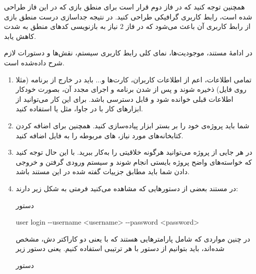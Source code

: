 \documentclass[]{article}
\begin{document}
همچنین توجه کنید که در فاز دوم قرار است برای منطق بازی که در این فاز طراحی شده است، رابط کاربری گرافیکی طراحی کنید. در نتیجه جداسازی درست منطق بازی از رابط کاربری آن باعث می‌شود که در فاز $2$ نیاز به بازنویسی کدهای منطق به شدت کاهش یابد. 

در ادامهٔ مستند، موجودیت‌ها، نمای کلی رابط کاربری سیستم، نقش‌ها و دستورات لازم شرح داده‌شده است.

\begin{enumerate}[label={نکته \arabic*:}]
\item
 تمامی اطلاعات، اعم از اطلاعات کاربران، کارت‌ها و... باید در خارج از برنامه (مثلا روی فایل) ذخیره شوند و پس از  شدن برنامه و اجرای مجدد آن، بصورت خودکار اطلاعات قبلی خوانده شود و قابل دسترسی باشد. برای این کار می‌توانید از ابزارهای کار با  در جاوا، مثل
  \href{https://www.tutorialspoint.com/gson/gson_quick_guide.htm}{\textcolor{blue}{}}
یا
  \href{https://github.com/amogilev/yagson}{\textcolor{blue}{}}
   استفاده‌ کنید.

\item
شما باید پروژه‌ی خود را بر بستر ابزار  پیاده‌سازی کنید. همچنین برای اضافه کردن کتابخانه‌های مورد نیاز،  های مربوطه را به فایل  اضافه کنید.




   

\item
در هر جایی از پروژه می‌توانید هرگونه خلاقیتی را به‌کار ببرید. با این حال توجه کنید که خواسته‌های واضح پروژه بایستی انجام شوند و سیستم ورودی گرفتن و خروجی دادن شما باید مطابق جزییات گفته شده در این مستند باشد.


\item
در مستند بعضی از دستور‌هایی که مشاهده می‌کنید فرمتی به شکل زیر دارند:

\begin{mybox}[colback=yellow]{دستور}
	
	
	\begin{latin}
		
	user login -{}-username <username> -{}-password <password>
		
	\end{latin}
	
\end{mybox}

در چنین مواردی که شامل پارامتر‌هایی هستند که با
\lr{-{}-}
یعنی دو کاراکتر دش، مشخص شده‌اند، باید بتوانیم از دستور با هر ترتیبی استفاده کنیم. یعنی دستور زیر

\begin{mybox}[colback=yellow]{دستور}
	

\end{mybox}
\end{enumerate}
\end{document}

